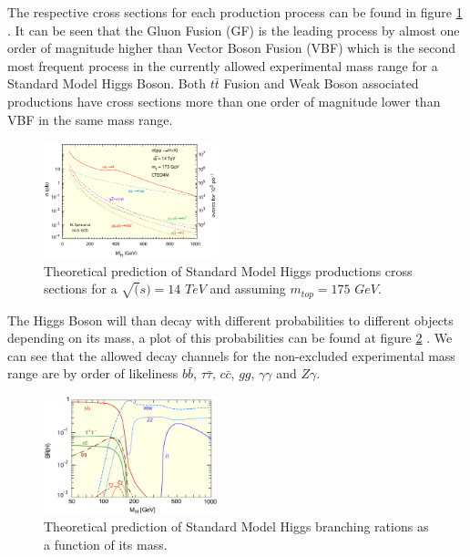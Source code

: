 \documentclass[%
 reprint,
 amsmath,
 amssymb,
 aps,
 pra,
 showkeys
]{revtex4-1}
\begin{document}
The respective cross sections for each production process can be found in figure \ref{figure_SMHiggs_XSec}
\cite{Takahashi:1019873}. It can be seen that the Gluon Fusion (GF) is the leading process by almost one order of magnitude higher than Vector 
Boson Fusion (VBF) which is the second most frequent process in the currently allowed experimental mass range for a 
Standard Model Higgs Boson. Both $t\bar{t}$ Fusion and Weak Boson associated productions have cross sections more than
one order of magnitude lower than VBF in the same mass range.

\begin{figure}[ht]
\centering
\includegraphics[width=0.45\textwidth]{img/SMHiggs_XSec.png} 
\caption{Theoretical prediction of Standard Model Higgs productions cross sections for a $\sqrt(s)=14$ $TeV$ 
and assuming $m_{top}=175$ $GeV$.}
\label{figure_SMHiggs_XSec}
\end{figure}

The Higgs Boson will than decay with different probabilities to different objects depending on its mass, a plot
of this probabilities can be found at figure \ref{figure_SMHiggs_BR} \cite{Takahashi:1019873}. We can see that the 
allowed decay channels for the non-excluded experimental mass range are by order of likeliness $b\bar{b}$, 
$\tau\bar{\tau}$, $c\bar{c}$, $gg$, $\gamma\gamma$ and $Z\gamma$.

\begin{figure}[ht]
\centering
\includegraphics[width=0.45\textwidth]{img/SMHiggs_BR.png} 
\caption{Theoretical prediction of Standard Model Higgs branching rations as a function of its mass.}
\label{figure_SMHiggs_BR}
\end{figure}
\end{document}
